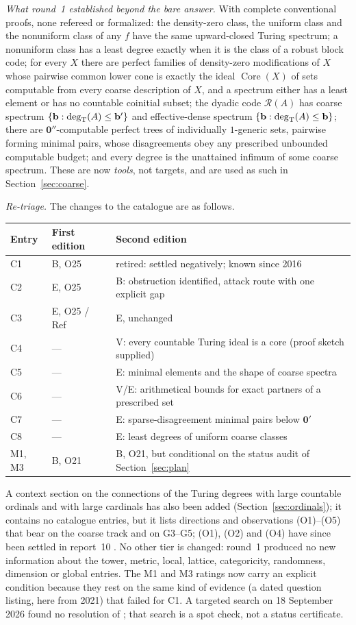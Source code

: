 \documentclass[11pt,a4paper]{article}
\newcommand{\R}{\mathcal R}
\newcommand{\degT}{\operatorname{deg}_{\mathrm T}}
\newcommand{\zero}{\mathbf0}
\newcommand{\Core}{\operatorname{Core}}\newcommand{\Low}{\mathcal L}
\theoremstyle{definition}\newtheorem{definition}[theorem]{Definition}
\theoremstyle{remark}\newtheorem{remark}[theorem]{Remark}
\begin{document}
\emph{What round~1 established beyond the bare answer.} With complete conventional proofs, none refereed or formalized: the density-zero class, the uniform class and the nonuniform class of any $f$ have the same upward-closed Turing spectrum; a nonuniform class has a least degree exactly when it is the class of a robust block code; for every $X$ there are perfect families of density-zero modifications of $X$ whose pairwise common lower cone is exactly the ideal $\Core(X)$ of sets computable from every coarse description of $X$, and a spectrum either has a least element or has no countable coinitial subset; the dyadic code $\R(A)$ has coarse spectrum $\{\bdeg:\degT(A)\le\bdeg'\}$ and effective-dense spectrum $\{\bdeg:\degT(A)\le\bdeg\}$; there are $\zero''$-computable perfect trees of individually $1$-generic sets, pairwise forming minimal pairs, whose disagreements obey any prescribed unbounded computable budget; and every degree is the unattained infimum of some coarse spectrum. These are now \emph{tools}, not targets, and are used as such in Section~\ref{sec:coarse}.

\emph{Re-triage.} The changes to the catalogue are as follows.
\begin{center}\small
\begin{tabular}{@{}lll@{}}
\toprule
Entry & First edition & Second edition\\\midrule
C1 & B, O25 & retired: settled negatively; known since 2016\\
C2 & E, O25 & B: obstruction identified, attack route with one explicit gap\\
C3 & E, O25 / Ref & E, unchanged\\
C4 & --- & V: every countable Turing ideal is a core (proof sketch supplied)\\
C5 & --- & E: minimal elements and the shape of coarse spectra\\
C6 & --- & V/E: arithmetical bounds for exact partners of a prescribed set\\
C7 & --- & E: sparse-disagreement minimal pairs below $\zero'$\\
C8 & --- & E: least degrees of uniform coarse classes\\
M1, M3 & B, O21 & B, O21, but conditional on the status audit of Section~\ref{sec:plan}\\
\bottomrule
\end{tabular}
\end{center}
A context section on the connections of the Turing degrees with large countable ordinals and with large cardinals has also been added (Section~\ref{sec:ordinals}); it contains no catalogue entries, but it lists directions and observations (O1)--(O5) that bear on the coarse track and on G3--G5; (O1), (O2) and (O4) have since been settled in report~10 \cite{ReportTen}. No other tier is changed: round~1 produced no new information about the tower, metric, local, lattice, categoricity, randomness, dimension or global entries. The M1 and M3 ratings now carry an explicit condition because they rest on the same kind of evidence (a dated question listing, here from 2021) that failed for C1. A targeted search on 18 September 2026 found no resolution of \cite[Questions 9.3 and 9.7]{HJS}; that search is a spot check, not a status certificate.
\end{document}
